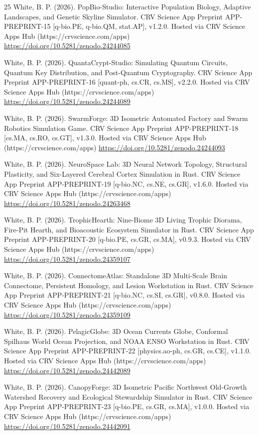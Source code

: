 \documentclass[10pt,letterpaper]{article}
\begin{document}
\begin{thebibliography}{25}
 White, B. P. (2026). PopBio-Studio: Interactive Population Biology, Adaptive Landscapes, and Genetic Skyline Simulator. CRV Science App Preprint APP-PREPRINT-15 [q-bio.PE, q-bio.QM, stat.AP], v1.2.0. Hosted via CRV Science Apps Hub (https://crvscience.com/apps) \url{https://doi.org/10.5281/zenodo.24244085}

 White, B. P. (2026). QuantaCrypt-Studio: Simulating Quantum Circuits, Quantum Key Distribution, and Post-Quantum Cryptography. CRV Science App Preprint APP-PREPRINT-16 [quant-ph, cs.CR, cs.MS], v2.2.0. Hosted via CRV Science Apps Hub (https://crvscience.com/apps) \url{https://doi.org/10.5281/zenodo.24244089}

 White, B. P. (2026). SwarmForge: 3D Isometric Automated Factory and Swarm Robotics Simulation Game. CRV Science App Preprint APP-PREPRINT-18 [cs.MA, cs.RO, cs.GT], v1.3.0. Hosted via CRV Science Apps Hub (https://crvscience.com/apps) \url{https://doi.org/10.5281/zenodo.24244093}

 White, B. P. (2026). NeuroSpace Lab: 3D Neural Network Topology, Structural Plasticity, and Six-Layered Cerebral Cortex Simulation in Rust. CRV Science App Preprint APP-PREPRINT-19 [q-bio.NC, cs.NE, cs.GR], v1.6.0. Hosted via CRV Science Apps Hub (https://crvscience.com/apps) \url{https://doi.org/10.5281/zenodo.24263468}

 White, B. P. (2026). TrophicHearth: Nine-Biome 3D Living Trophic Diorama, Fire-Pit Hearth, and Bioacoustic Ecosystem Simulator in Rust. CRV Science App Preprint APP-PREPRINT-20 [q-bio.PE, cs.GR, cs.MA], v0.9.3. Hosted via CRV Science Apps Hub (https://crvscience.com/apps) \url{https://doi.org/10.5281/zenodo.24359107}

 White, B. P. (2026). ConnectomeAtlas: Standalone 3D Multi-Scale Brain Connectome, Persistent Homology, and Lesion Workstation in Rust. CRV Science App Preprint APP-PREPRINT-21 [q-bio.NC, cs.SI, cs.GR], v0.8.0. Hosted via CRV Science Apps Hub (https://crvscience.com/apps) \url{https://doi.org/10.5281/zenodo.24359109}

 White, B. P. (2026). PelagicGlobe: 3D Ocean Currents Globe, Conformal Spilhaus World Ocean Projection, and NOAA ENSO Workstation in Rust. CRV Science App Preprint APP-PREPRINT-22 [physics.ao-ph, cs.GR, cs.CE], v1.1.0. Hosted via CRV Science Apps Hub (https://crvscience.com/apps) \url{https://doi.org/10.5281/zenodo.24442089}

 White, B. P. (2026). CanopyForge: 3D Isometric Pacific Northwest Old-Growth Watershed Recovery and Ecological Stewardship Simulator in Rust. CRV Science App Preprint APP-PREPRINT-23 [q-bio.PE, cs.GR, cs.MA], v1.0.0. Hosted via CRV Science Apps Hub (https://crvscience.com/apps) \url{https://doi.org/10.5281/zenodo.24442091}


\end{thebibliography}
\end{document}
